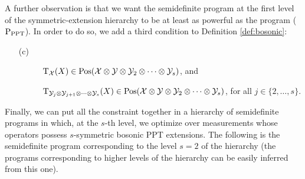 A further observation is that we want the semidefinite program at the first level 
of the symmetric-extension hierarchy to be at least as powerful as the program 
($\textup{P}_{\mathrm{PPT}}$). In order to do so, we add a third condition to Definition 
\ref{def:bosonic}:
  \begin{itemize}
    \item[(c)] 
      \begin{description}
        \item[] $\operatorname{T}_{\mathcal{X}}(X) \in \mathrm{Pos}(\mathcal{X}\otimes\mathcal{Y}\otimes\mathcal{Y}_{2}\otimes\cdots\otimes\mathcal{Y}_{s})$, and
        \item[] $\operatorname{T}_{\mathcal{Y}_{j}\otimes\mathcal{Y}_{j+1}\otimes\cdots\otimes\mathcal{Y}_{s}}(X) \in 
      \mathrm{Pos}(\mathcal{X}\otimes\mathcal{Y}\otimes\mathcal{Y}_{2}\otimes\cdots\otimes\mathcal{Y}_{s})$, 
      for all $j \in \{2, \ldots, s\}$.
      \end{description}
  \end{itemize}

Finally, we can put all the constraint together in a hierarchy of semidefinite programs 
in which, at the $s$-th level, we optimize over measurements whose operators possess 
$s$-symmetric bosonic PPT extensions. 
The following is the semidefinite program corresponding to the level $s = 2$ of 
the hierarchy (the programs corresponding to higher levels of the hierarchy can 
be easily inferred from this one).

